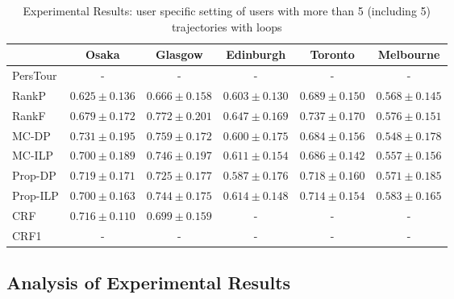 \begin{table*}
\centering
\caption{Experimental Results: user specific setting of users with more than 5 (including 5) trajectories with loops}
\begin{tabular}{l|ccccc} \hline
 & Osaka & Glasgow & Edinburgh & Toronto & Melbourne \\ \hline
PersTour & - & - & - & - & - \\
RankP & $0.625\pm0.136$ & $0.666\pm0.158$ & $0.603\pm0.130$ & $0.689\pm0.150$ & $0.568\pm0.145$ \\
RankF & $0.679\pm0.172$ & $\mathbf{0.772\pm0.201}$ & $0.647\pm0.169$ & $\mathbf{0.737\pm0.170}$ & $0.576\pm0.151$ \\
MC-DP & $\mathbf{0.731}\pm0.195$ & $0.759\pm0.172$ & $0.600\pm0.175$ & $0.684\pm0.156$ & $0.548\pm0.178$ \\
MC-ILP & $0.700\pm0.189$ & $0.746\pm0.197$ & $0.611\pm0.154$ & $0.686\pm0.142$ & $0.557\pm0.156$ \\
Prop-DP & $0.719\pm0.171$ & $0.725\pm0.177$ & $0.587\pm0.176$ & $0.718\pm0.160$ & $0.571\pm0.185$ \\
Prop-ILP & $0.700\pm0.163$ & $0.744\pm0.175$ & $0.614\pm0.148$ & $0.714\pm0.154$ & $\mathbf{0.583\pm0.165}$ \\
CRF & $0.716\pm0.110$ & $0.699\pm0.159$ & - & - & - \\
CRF1 & - & - & - & - & - \\
\hline
\end{tabular}
\end{table*}




\subsection{Analysis of Experimental Results}
\label{experiment:analysis}
